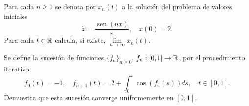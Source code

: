 \documentclass[12pt]{article}
\begin{document}
    \begin{ejercicio}
        Para cada $n \geq 1$ se denota por $x_n(t)$ a la solución del problema de valores iniciales
        \[
        \dot{x} = \frac{\operatorname{sen}(nx)}{n}, \quad x(0) = 2.
        \]
        Para cada $t \in \mathbb{R}$ calcula, si existe, $\lim\limits_{n \to \infty} x_n(t)$.
    \end{ejercicio}

    \begin{ejercicio}
        Se define la sucesión de funciones $\{f_n\}_{n \geq 0}$, $f_n : \left[0, 1\right] \to \mathbb{R}$, por el procedimiento iterativo
        \[
        f_0(t) = -1, \quad f_{n+1}(t) = 2 + \int_0^t \cos(f_n(s))ds, \quad t \in \left[0, 1\right].
        \]
        Demuestra que esta sucesión converge uniformemente en $\left[0, 1\right]$.
    \end{ejercicio}

    \newpage
    \setcounter{ejercicio}{0} %
\end{document}
